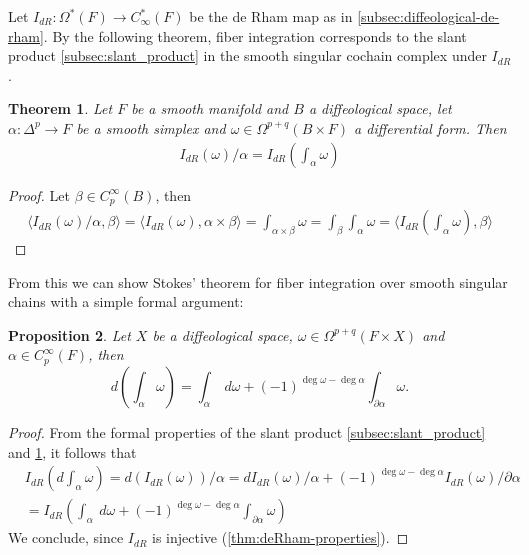 \documentclass{scrartcl}
\theoremstyle{plain}
\newtheorem{theorem}{Theorem}[section]
\newtheorem{proposition}[theorem]{Proposition}
\theoremstyle{definition}
\begin{document}
Let $I_{dR}\colon \Omega^*(F)\to C_\infty^*(F)$ be the de Rham map as in \cref{subsec:diffeological-de-rham}. By the following theorem, fiber integration corresponds to the slant product \cref{subsec:slant_product} in the smooth singular cochain complex under $I_{dR}$.
\begin{theorem}\label{thm:fiber-integral-slant-product}
    Let $F$ be a smooth manifold and $B$ a diffeological space, let $\alpha\colon\Delta^p\to F$ be a smooth simplex and $\omega\in\Omega^{p+q}(B\times F)$ a differential form. Then
    \begin{align*}
        I_{dR}(\omega) / \alpha = I_{dR}\left(\int_{\alpha} \omega\right)
    \end{align*}
\end{theorem}
\begin{proof}
    Let $\beta\in C^\infty_p(B)$, then
    \begin{align*}
        \langle I_{dR}(\omega) / \alpha, \beta\rangle = \langle I_{dR}(\omega), \alpha\times \beta\rangle = \int_{\alpha\times \beta} \omega = \int_\beta \int_\alpha\omega = \langle I_{dR}\left(\int_{\alpha}\omega\right), \beta\rangle
    \end{align*}
\end{proof}

From this we can show Stokes' theorem for fiber integration over smooth singular chains with a simple formal argument:
\begin{proposition}\label{thm:fiber-stokes}
    Let $X$ be a diffeological space, $\omega\in\Omega^{p+q}(F\times X)$ and $\alpha\in C_p^\infty(F)$, then
    $$d\left(\int_\alpha\omega\right) = \int_\alpha\ d\omega + (-1)^{\deg \omega - \deg\alpha}\int_{\partial \alpha} \omega.$$
\end{proposition}
\begin{proof}
    From the formal properties of the slant product \cref{subsec:slant_product} and \ref{thm:fiber-integral-slant-product}, it follows that
    \begin{align*}
        &I_{dR}\left(d\int_\alpha\omega\right) = d (I_{dR}(\omega)) / \alpha = dI_{dR}(\omega) / \alpha + (-1)^{\deg \omega - \deg \alpha}I_{dR}(\omega) / \partial \alpha \\&= I_{dR}\left(\int_\alpha\ d\omega + (-1)^{\deg \omega - \deg\alpha}\int_{\partial \alpha} \omega\right)
    \end{align*}
    We conclude, since $I_{dR}$ is injective (\ref{thm:deRham-properties}).
\end{proof}
\end{document}
